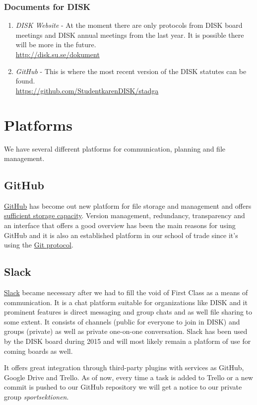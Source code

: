 \documentclass[12pt,a4paper]{article}
\begin{document}
		\subsubsection{Documents for DISK}
		\begin{enumerate}
			\item \emph{DISK Website} - At the moment there are only protocols from DISK board meetings and DISK annual meetings from the last year. It is possible there will be more in the future.\\
			\url{http://disk.su.se/dokument}
			\item \emph{GitHub} - This is where the most recent version of the DISK statutes can be found.\\
			\url{https://github.com/StudentkarenDISK/stadga}
		\end{enumerate}

	\section{Platforms}
		We have several different platforms for communication, planning and file management.
		\subsection{GitHub}
			\href{http://github.com}{GitHub} has become out new platform for file storage and management and offers \href{https://help.github.com/articles/what-is-my-disk-quota/}{sufficient storage capacity}. Version management, redundancy, transparency and an interface that offers a good overview has been the main reasons for using GitHub and it is also an established platform in our school of trade since it's using the \href{https://git-scm.com/videos}{Git protocol}.
		\subsection{Slack}
			\href{http://diskdsv.slack.com}{Slack} became necessary after we had to fill the void of First Class as a means of communication. It is a chat platform suitable for organizations like DISK and it prominent features is direct messaging and group chats and as well file sharing to some extent. It consists of channels (public for everyone to join in DISK) and groups (private) as well as private one-on-one conversation. Slack has been used by the DISK board during 2015 and will most likely remain a platform of use for coming boards as well.

			It offers great integration through third-party plugins with services as GitHub, Google Drive and Trello. As of now, every time a task is added to Trello or a new commit is pushed to our GitHub repository we will get a notice to our private group \emph{sportsektionen}.
\end{document}
